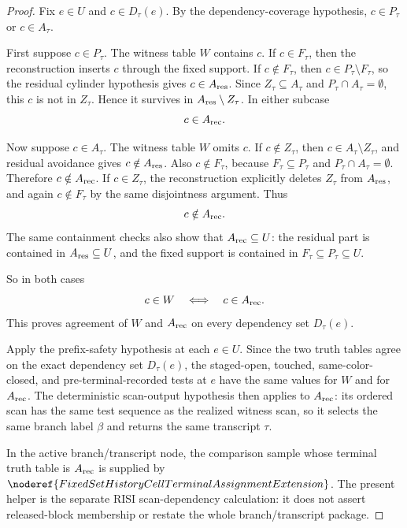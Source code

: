 \begin{proof}
Fix \(e\in U\) and \(c\in D_\tau(e)\).  By the dependency-coverage
hypothesis, \(c\in P_\tau\) or \(c\in A_\tau\).

First suppose \(c\in P_\tau\).  The witness table \(W\) contains \(c\).  If
\(c\in F_\tau\), then the reconstruction inserts \(c\) through the fixed
support.  If \(c\notin F_\tau\), then
\(c\in P_\tau\setminus F_\tau\), so the residual cylinder hypothesis gives
\(c\in A_{\rm res}\).  Since \(Z_\tau\subseteq A_\tau\) and
\(P_\tau\cap A_\tau=\emptyset\), this \(c\) is not in \(Z_\tau\).  Hence it
survives in \(A_{\rm res}\setminus Z_\tau\).  In either subcase
\[
c\in A_{\rm rec}.
\]

Now suppose \(c\in A_\tau\).  The witness table \(W\) omits \(c\).  If
\(c\notin Z_\tau\), then \(c\in A_\tau\setminus Z_\tau\), and residual
avoidance gives \(c\notin A_{\rm res}\).  Also \(c\notin F_\tau\), because
\(F_\tau\subseteq P_\tau\) and \(P_\tau\cap A_\tau=\emptyset\).  Therefore
\(c\notin A_{\rm rec}\).  If \(c\in Z_\tau\), the reconstruction explicitly
deletes \(Z_\tau\) from \(A_{\rm res}\), and again
\(c\notin F_\tau\) by the same disjointness argument.  Thus
\[
c\notin A_{\rm rec}.
\]
The same containment checks also show that \(A_{\rm rec}\subseteq U\): the
residual part is contained in \(A_{\rm res}\subseteq U\), and the fixed
support is contained in \(F_\tau\subseteq P_\tau\subseteq U\).

So in both cases
\[
c\in W\quad\Longleftrightarrow\quad c\in A_{\rm rec}.
\]
This proves agreement of \(W\) and \(A_{\rm rec}\) on every dependency set
\(D_\tau(e)\).

Apply the prefix-safety hypothesis at each \(e\in U\).  Since the two truth
tables agree on the exact dependency set \(D_\tau(e)\), the staged-open,
touched, same-color-closed, and pre-terminal-recorded tests at \(e\) have
the same values for \(W\) and for \(A_{\rm rec}\).  The deterministic
scan-output hypothesis then applies to \(A_{\rm rec}\): its ordered scan has
the same test sequence as the realized witness scan, so it selects the same
branch label \(\beta\) and returns the same transcript \(\tau\).

In the active branch/transcript node, the comparison sample whose terminal
truth table is \(A_{\rm rec}\) is supplied by
\(\noderef{FixedSetHistoryCellTerminalAssignmentExtension}\).  The present
helper is the separate RISI scan-dependency calculation: it does not assert
released-block membership or restate the whole branch/transcript package.
\end{proof}
